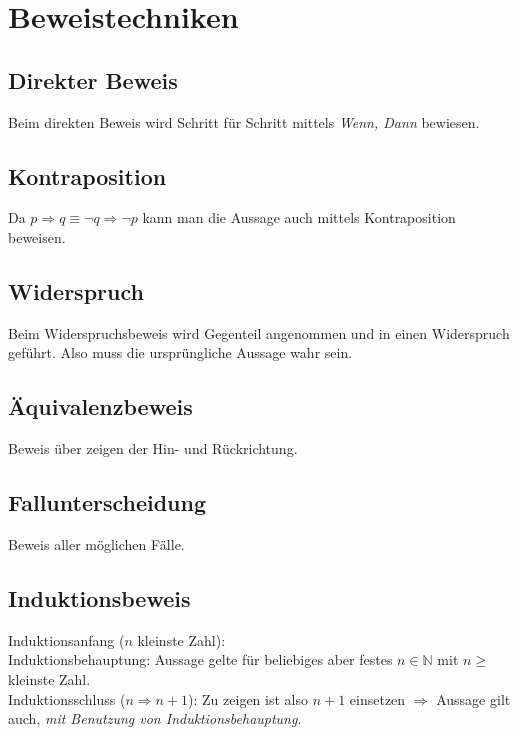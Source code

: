 \section{Beweistechniken}
\subsection*{Direkter Beweis}
Beim direkten Beweis wird Schritt für Schritt mittels \emph{Wenn, Dann} bewiesen.
\subsection*{Kontraposition}
Da $p\Rightarrow q\equiv \neg q\Rightarrow \neg p$ kann man die Aussage auch mittels Kontraposition beweisen.
\subsection*{Widerspruch}
Beim Widerspruchsbeweis wird Gegenteil angenommen und in einen Widerspruch geführt.
Also muss die ursprüngliche Aussage wahr sein.
\subsection*{Äquivalenzbeweis}
Beweis über zeigen der Hin- und Rückrichtung.
\subsection*{Fallunterscheidung}
Beweis aller möglichen Fälle.
\subsection*{Induktionsbeweis}
Induktionsanfang ($n$ kleinste Zahl):\\
Induktionsbehauptung: Aussage gelte für beliebiges aber festes $n\in \mathbb{N}$ mit $n\geq$ kleinste Zahl.\\
Induktionsschluss ($n \Longrightarrow n+1$): Zu zeigen ist also $n+1$ einsetzen $\Rightarrow$ Aussage gilt auch,
\emph{mit Benutzung von Induktionsbehauptung}.
